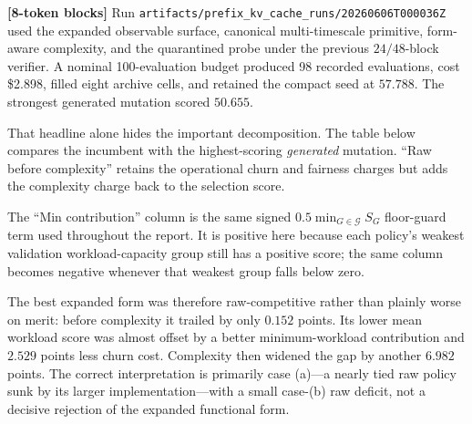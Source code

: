 \documentclass[11pt]{article}
\newcommand{\filepath}[1]{\nolinkurl{#1}}
\newcommand{\blocktag}[1]{\textbf{\color{navy}[#1-token blocks]}}
\begin{document}
\blocktag{8} Run \filepath{artifacts/prefix_kv_cache_runs/20260606T000036Z} used the
expanded observable surface, canonical multi-timescale primitive, form-aware complexity, and
the quarantined probe under the previous \(24/48\)-block verifier.  A nominal
100-evaluation budget produced 98 recorded evaluations, cost \$2.898, filled eight
archive cells, and retained the compact seed at
\(57.788\).  The strongest generated mutation scored \(50.655\).

That headline alone hides the important decomposition.  The table below compares the
incumbent with the highest-scoring \emph{generated} mutation.  ``Raw before
complexity'' retains the operational churn and fairness charges but adds the
complexity charge back to the selection score.

\begin{center}
\scriptsize
{}
\end{center}

The ``Min contribution'' column is the same signed
\(0.5\min_{G\in\mathcal{G}}S_G\) floor-guard term used throughout the report.  It is
positive here because each policy's weakest validation workload-capacity group still
has a positive score; the same column becomes negative whenever that weakest group
falls below zero.

The best expanded form was therefore raw-competitive rather than plainly worse on
merit: before complexity it trailed by only \(0.152\) points.  Its lower mean workload
score was almost offset by a better minimum-workload contribution and \(2.529\) points
less churn cost.  Complexity then widened the gap by another \(6.982\) points.  The
correct interpretation is primarily case (a)---a nearly tied raw policy sunk by its
larger implementation---with a small case-(b) raw deficit, not a decisive rejection of
the expanded functional form.
\end{document}
